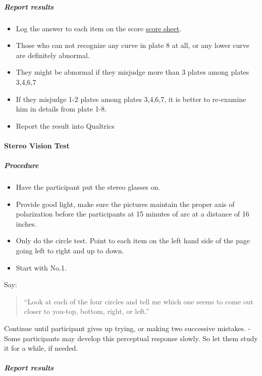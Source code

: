 \documentclass[]{article}
\providecommand{\tightlist}{%
  \setlength{\itemsep}{0pt}\setlength{\parskip}{0pt}}
\let\oldparagraph\paragraph
\renewcommand{\paragraph}[1]{\oldparagraph{#1}\mbox{}}
\let\oldsubparagraph\subparagraph
\renewcommand{\subparagraph}[1]{\oldsubparagraph{#1}\mbox{}}
\begin{document}
\subparagraph{Report results}\label{report-results-1}

\begin{itemize}
\tightlist
\item
  Log the answer to each item on the score
  \href{vision-screening-score-sheet.html}{score sheet}.
\item
  Those who can not recognize any curve in plate 8 at all, or any lower
  curve are definitely abnormal.
\item
  They might be abnormal if they misjudge more than 3 plates among
  plates 3,4,6,7
\item
  If they misjudge 1-2 plates among plates 3,4,6,7, it is better to
  re-examine him in details from plate 1-8.
\item
  Report the result into Qualtrics
\end{itemize}

\paragraph{Stereo Vision Test}\label{stereo-vision-test}

\subparagraph{Procedure}\label{procedure-2}

\begin{itemize}
\tightlist
\item
  Have the participant put the stereo glasses on.
\item
  Provide good light, make sure the pictures maintain the proper axis of
  polarization before the participants at 15 minutes of arc at a
  distance of 16 inches.
\item
  Only do the circle test. Point to each item on the left hand side of
  the page going left to right and up to down.
\item
  Start with No.1.
\end{itemize}

Say:

\begin{quote}
``Look at each of the four circles and tell me which one seems to come
out closer to you-top, bottom, right, or left.''
\end{quote}

Continue until participant gives up trying, or making two successive
mistakes. - Some participants may develop this perceptual response
slowly. So let them study it for a while, if needed.

\subparagraph{Report results}\label{report-results-2}
\end{document}
